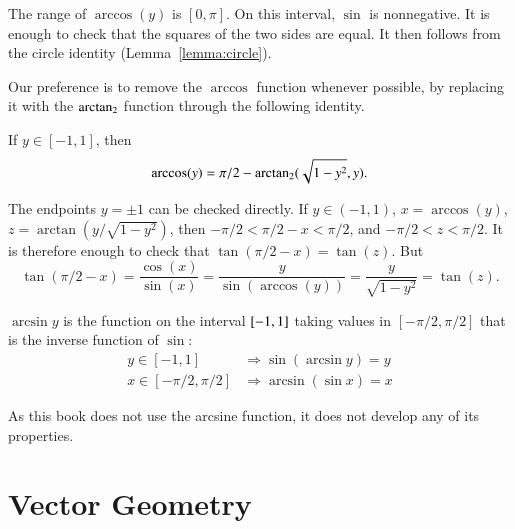 \begin{proved}
    The range of $\arccos(y)$ is $[0,\pi]$.  On this interval, $\sin$
    is nonnegative.  It is enough to check that the squares of the two sides are equal.  It then follows from the circle identity
    (Lemma~\ref{lemma:circle}).
\swallowed\end{proved}


Our preference is to remove the $\arccos$ function whenever
possible, by replacing it with the ${\operatorname{arctan_2}}$ function through the
following identity.  


\begin{lemma}\label{lemma:arccos-arctan}  
If $y\in [-1,1]$, then
    $$\arccos(y) = \pi/2 - {\operatorname{arctan_2}}({ \sqrt{1-y^2}},{y}).$$
\end{lemma}

\begin{proved}
The endpoints $y=\pm1$ can be checked directly.
If $y\in (-1,1)$,  $x = \arccos(y)$, 
$z = \arctan(y/\sqrt{1-y^2})$, then
    $-\pi/2 < \pi/2 - x < \pi/2$, and $-\pi/2 < z < \pi/2$.  It is
    therefore enough to check that
        $\tan(\pi/2 - x) = \tan(z)$.
    But
        $$\tan(\pi/2-x) = \frac{\cos(x)}{\sin(x)} = \frac{y}{
        \sin(\arccos(y))} = \frac{y}{ \sqrt{1-y^2}} = \tan(z).$$
\swallowed\end{proved}

\begin{definition}[arcsine]\label{def:arcsin}
$\arcsin y$ is the function on the interval $[
-1,1]$ taking values in $[-\pi/2,\pi/2]$ that is the
inverse function of $\sin$:
    $$\begin{array}{lll}
        y\in [-1,1] &\Rightarrow \sin(\arcsin y) = y\\
        x\in[-\pi/2,\pi/2] &\Rightarrow \arcsin(\sin x) = x
    \end{array}$$
\end{definition}

As this book does not use the arcsine function, it does not develop any of its properties.





\section{Vector Geometry}


